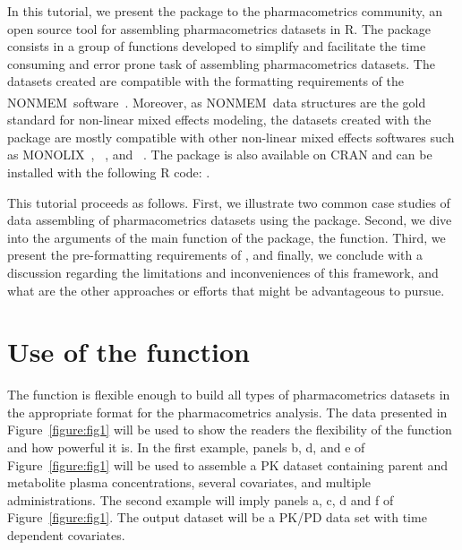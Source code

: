 In this tutorial, we present the  package to the pharmacometrics community, an open source tool for assembling pharmacometrics datasets in R. The  package consists in a group of functions developed to simplify and facilitate the time consuming and error prone task of assembling pharmacometrics datasets. The datasets created are compatible with the formatting requirements of the NONMEM\textsuperscript{\textregistered}~software~\citep{Beal2009}. Moreover, as NONMEM\textsuperscript{\textregistered}~data structures are the gold standard for non-linear mixed effects modeling, the datasets created with the  package are mostly compatible with other non-linear mixed effects softwares such as MONOLIX~\citep{Lixoft}, ~\citep{Comets2011},  and ~\citep{Fidler2019}.  The  package is also available on CRAN and can be installed with the following R code: .

This tutorial proceeds as follows. First, we illustrate two common case studies of data assembling of pharmacometrics datasets using the  package. Second, we dive into the arguments of the main function of the  package, the  function. Third, we present the pre-formatting requirements of , and finally, we conclude with a discussion regarding the limitations and inconveniences of this framework, and what are the other approaches or efforts that might be advantageous to pursue.

\section{Use of the  function}

The   function is flexible enough to build all types of pharmacometrics datasets in the appropriate format for the pharmacometrics analysis. The data presented in Figure~\ref{figure:fig1} will be used to show the readers the flexibility of the   function and how powerful it is. In the first example, panels b, d, and e of Figure~\ref{figure:fig1} will be used to assemble a PK dataset containing parent and metabolite plasma concentrations, several covariates, and multiple administrations. The second example will imply panels a, c, d and f of Figure~\ref{figure:fig1}. The output dataset will be a PK/PD data set with time dependent covariates.

